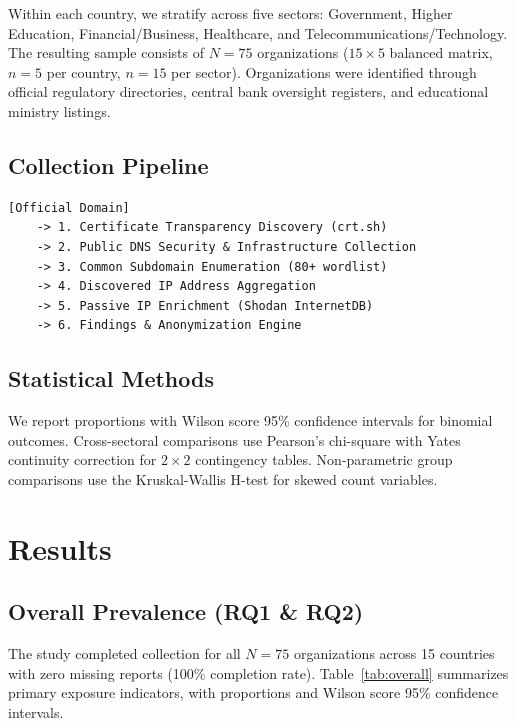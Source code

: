 \documentclass[conference]{IEEEtran}
\begin{document}
Within each country, we stratify across five sectors: Government, Higher Education, Financial/Business, Healthcare, and Telecommunications/Technology. The resulting sample consists of $N = 75$ organizations ($15 \times 5$ balanced matrix, $n=5$ per country, $n=15$ per sector). Organizations were identified through official regulatory directories, central bank oversight registers, and educational ministry listings.

\subsection{Collection Pipeline}
\begin{verbatim}
[Official Domain]
    -> 1. Certificate Transparency Discovery (crt.sh)
    -> 2. Public DNS Security & Infrastructure Collection
    -> 3. Common Subdomain Enumeration (80+ wordlist)
    -> 4. Discovered IP Address Aggregation
    -> 5. Passive IP Enrichment (Shodan InternetDB)
    -> 6. Findings & Anonymization Engine
\end{verbatim}

\subsection{Statistical Methods}
We report proportions with Wilson score 95\% confidence intervals \cite{wilson1927probable} for binomial outcomes. Cross-sectoral comparisons use Pearson's chi-square with Yates continuity correction for $2 \times 2$ contingency tables. Non-parametric group comparisons use the Kruskal-Wallis H-test for skewed count variables.

\section{Results}

\subsection{Overall Prevalence (RQ1 \& RQ2)}

The study completed collection for all $N = 75$ organizations across 15 countries with zero missing reports (100\% completion rate). Table~\ref{tab:overall} summarizes primary exposure indicators, with proportions and Wilson score 95\% confidence intervals.
\end{document}
